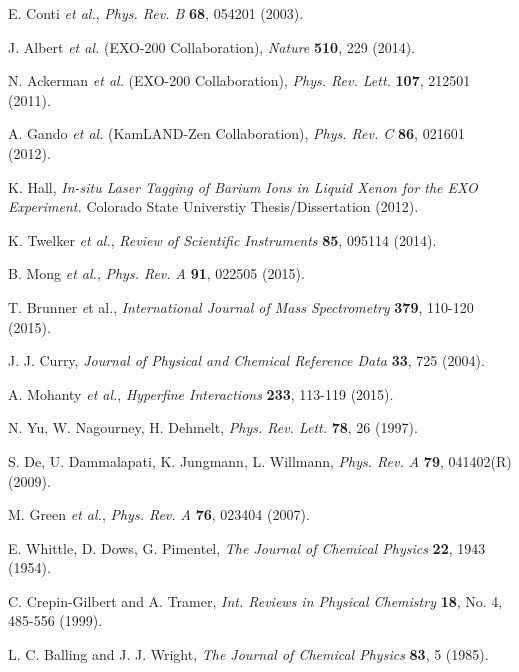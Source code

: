 \documentclass[PhD, copyrightpage]{csuthesis} %
\begin{document}
\begin{thebibliography}{00}
  E. Conti \emph{et al.}, \emph{Phys. Rev. B} \textbf{68}, 054201 (2003).
 
  J. Albert \emph{et al.} (EXO-200 Collaboration), \emph{Nature} \textbf{510}, 229 (2014).
 
  N. Ackerman \emph{et al.} (EXO-200 Collaboration), \emph{Phys. Rev. Lett.} \textbf{107}, 212501 (2011).
 
  A. Gando \emph{et al.} (KamLAND-Zen Collaboration), \emph{Phys. Rev. C} \textbf{86}, 021601 (2012).
 
  K. Hall, \emph{In-situ Laser Tagging of Barium Ions in Liquid Xenon for the EXO Experiment.}  Colorado State Universtiy Thesis/Dissertation (2012).
 
  K. Twelker \emph{et al.}, \emph{Review of Scientific Instruments} \textbf{85}, 095114 (2014).
 
  B. Mong \emph{et al.}, \emph{Phys. Rev. A} \textbf{91}, 022505 (2015).
 
  T. Brunner \emph et al., \emph{International Journal of Mass Spectrometry} \textbf{379}, 110-120 (2015).
 
 
  J. J. Curry, \emph{Journal of Physical and Chemical Reference Data} \textbf{33}, 725 (2004).
 
 
  A. Mohanty \emph{et al.}, \emph{Hyperfine Interactions} \textbf{233}, 113-119 (2015).
 
  N. Yu, W. Nagourney, H. Dehmelt, \emph{Phys. Rev. Lett.} \textbf{78}, 26 (1997).
 
  S. De, U. Dammalapati, K. Jungmann, L. Willmann, \emph{Phys. Rev. A} \textbf{79}, 041402(R) (2009).
 
  M. Green \emph{et al.}, \emph{Phys. Rev. A} \textbf{76}, 023404 (2007).
 
  E. Whittle, D. Dows, G. Pimentel, \emph{The Journal of Chemical Physics} \textbf{22}, 1943 (1954).
 
  C. Crepin-Gilbert and A. Tramer, \emph{Int. Reviews in Physical Chemistry} \textbf{18}, No. 4, 485-556 (1999).
 
  L. C. Balling and J. J. Wright, \emph{The Journal of Chemical Physics} \textbf{83}, 5 (1985).
 

\end{thebibliography}
\end{document}
